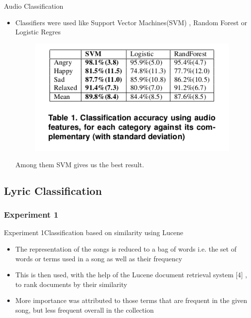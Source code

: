 \documentclass{beamer}
\begin{document}
\begin{frame}{Audio Classification}
	\begin{itemize}
	\item 
	  {
	  	Classifiers were used like Support Vector Machines(SVM) , Random Forest or Logistic Regres
	  	\begin{figure}
	  	\centering
	  	\includegraphics[scale = 0.5 ]{table1}
	  	\end{figure}
	  	Among them SVM gives us the best result.
	  	
	  }
 	\end{itemize}
\end{frame}

\subsection{Lyric Classification}

\subsubsection{Experiment 1}

\begin{frame}{Experiment 1}{Classification based on similarity using Lucene}
  \begin{itemize}
  \item {
    The representation of the songs is reduced to a bag of words i.e. the set of words or terms used in a song as well as their frequency
  }
  \item 
  {
  	This is then used, with the help of the Lucene document retrieval system [4] , to rank documents by their similarity   
    
  }
  \item
  {
  	More importance was attributed to those terms that are frequent in the given song, but less frequent overall in the collection
  }
  
  
  \end{itemize}
\end{frame}
\end{document}

